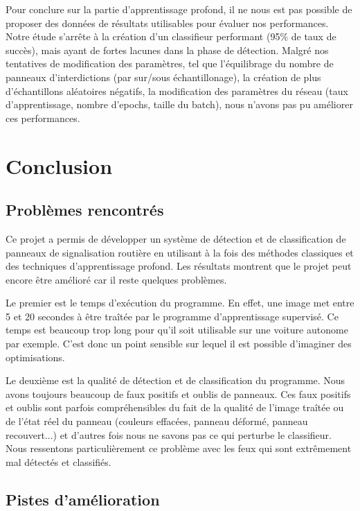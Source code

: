 \documentclass[a4paper,11pt]{article}
\begin{document}
Pour conclure sur la partie d'apprentissage profond, il ne nous est pas possible de proposer des données de résultats utilisables pour évaluer nos performances. Notre étude s'arrête à la création d'un classifieur performant (95\% de taux de succès), mais ayant de fortes lacunes dans la phase de détection. Malgré nos tentatives de modification des paramètres, tel que l'équilibrage du nombre de panneaux d'interdictions (par sur/sous échantillonage), la création de plus d'échantillons aléatoires négatifs, la modification des paramètres du réseau (taux d'apprentissage, nombre d'epochs, taille du batch), nous n'avons pas pu améliorer ces performances. 

\section{Conclusion}
\subsection{Problèmes rencontrés}
Ce projet a permis de développer un système de détection et de classification de panneaux de signalisation routière en utilisant à la fois des méthodes classiques et des techniques d'apprentissage profond. Les résultats montrent que le projet peut encore être amélioré car il reste quelques problèmes.

\vspace{2mm}

\noindent Le premier est le temps d'exécution du programme. En effet, une image met entre 5 et 20 secondes à être traîtée par le programme d'apprentissage supervisé. Ce temps est beaucoup trop long pour qu'il soit utilisable sur une voiture autonome par exemple. C'est donc un point sensible sur lequel il est possible d'imaginer des optimisations. 

\vspace{2mm}

\noindent Le deuxième est la qualité de détection et de classification du programme. Nous avons toujours beaucoup de faux positifs et oublis de panneaux. Ces faux positifs et oublis sont parfois compréhensibles du fait de la qualité de l'image traîtée ou de l'état réel du panneau (couleurs effacées, panneau déformé, panneau recouvert...) et d'autres fois nous ne savons pas ce qui perturbe le classifieur. Nous ressentons particulièrement ce problème avec les feux qui sont extrêmement mal détectés et classifiés.

\subsection{Pistes d'amélioration}
\end{document}
